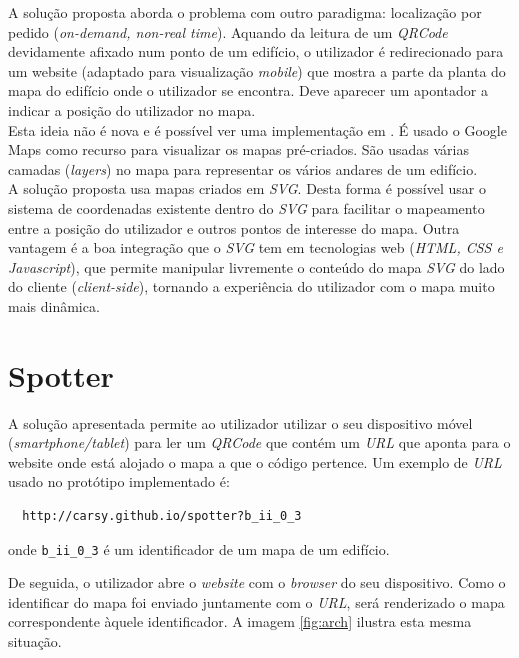 \documentclass[twocolumn,twoside,11pt]{article}
\newcommand{\svg}{\emph{SVG}}
\newcommand{\qrcode}{\emph{QRCode}}
\begin{document}
  A solução proposta aborda o problema com outro paradigma: localização por pedido (\emph{on-demand, non-real time}).
  Aquando da leitura de um \qrcode{} \cite{Wkhlu2008} devidamente afixado num ponto de um edifício, o utilizador é redirecionado para um website (adaptado para visualização \emph{mobile}) que mostra a parte da planta do mapa do edifício onde o utilizador se encontra.
  Deve aparecer um apontador a indicar a posição do utilizador no mapa.
  \\
  Esta ideia não é nova e é possível ver uma implementação em \cite{Costa2011}.
  É usado o Google Maps como recurso para visualizar os mapas pré-criados.
  São usadas várias camadas (\emph{layers}) no mapa para representar os vários andares de um edifício.
  \\

  A solução proposta usa mapas criados em \svg.
  Desta forma é possível usar o sistema de coordenadas existente dentro do \svg{} para facilitar o mapeamento entre a posição do utilizador e outros pontos de interesse do mapa.
  Outra vantagem é a boa integração que o \svg{} tem em tecnologias web (\emph{HTML, CSS e Javascript}), que permite manipular livremente o conteúdo do mapa \svg{} do lado do cliente (\emph{client-side}), tornando a experiência do utilizador com o mapa muito mais dinâmica.



\section{Spotter} %
\label{sec:solucao}

  A solução apresentada permite ao utilizador utilizar o seu dispositivo móvel (\emph{smartphone/tablet}) para ler um \qrcode{} que contém um \emph{URL} que aponta para o website onde está alojado o mapa a que o código pertence.
  Um exemplo de \emph{URL} usado no protótipo implementado é:

  \begin{verbatim}
  http://carsy.github.io/spotter?b_ii_0_3\end{verbatim}
  onde \verb+b_ii_0_3+ é um identificador de um mapa de um edifício.

  De seguida, o utilizador abre o \emph{website} com o \emph{browser} do seu dispositivo.
  Como o identificar do mapa foi enviado juntamente com o \emph{URL}, será renderizado o mapa correspondente àquele identificador. 
  A imagem \ref{fig:arch} ilustra esta mesma situação.
\end{document}
